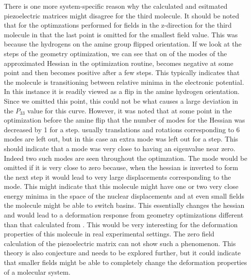 There is one more system-specific reason why the calculated and esitmated piezoelectric matrices might disagree for the third molecule. 
It should be noted that for the optimzations performed for fields in the z-direction for the third molecule in  that the last point is omitted for the smallest
field value.  
This was because the hydrogens on the amine group flipped orientation.  
If we look at the steps of the geometry optimization, we can see that on of the modes of the approximated Hessian in the optimization routine, becomes negative at some point and then becomes 
positive after a few steps.  
This typically indicates that the molecule is transitioning between relative minima in the electronic potential.  
In this instance it is readily viewed as a flip in the amine hydrogen orientation. 
Since we omitted this point, this could not be what causes a large deviation in the $P_33$ value for this curve.  
However, it was noted that at some point in the optimization before the amine flip that the number of modes for the Hessian was decreased by 1 for a step.  
usually translations and rotations corresponding to 6 modes are left out, but in this case an extra mode was left out for a step. 
This should indicate that a mode was very close to having an eigenvalue near zero.  
Indeed two such modes are seen throughout the optimzation.  
The mode would be omitted if it is very close to zero because, when the hessian is inverted to form the next step it would lead to very large displacements corresponding to the mode.
This might indicate that this molecule might have one or two very close energy minima in the space of the nuclear displacements and at even small fields the molecule might be able to switch basins. 
This essentially changes the hessian and would lead to a deformation response from geometry optimizations different than that calculated from .
This would be very interesting for the deformation properties of this molecule in real experimental settings.
The zero field calculation of the piezoelectric matrix can not show such a phenomenon.
This theory is also conjecture and needs to be explored further, but it could indicate that smaller fields might be able to completely change the deformation properties of a molecular system.
